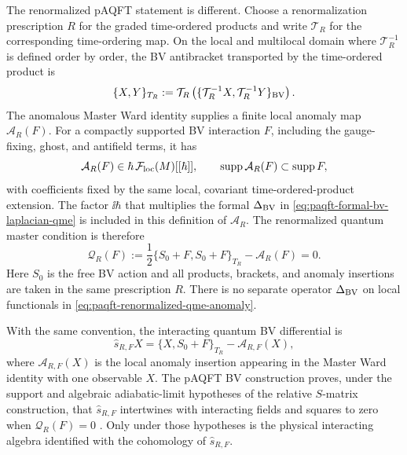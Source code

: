 The renormalized pAQFT statement is different.  Choose a renormalization
prescription \(R\) for the graded time-ordered products and write
\(\mathcal T_R\) for the corresponding time-ordering map.  On the local and
multilocal domain where \(\mathcal T_R^{-1}\) is defined order by order, the
BV antibracket transported by the time-ordered product is
\begin{equation}
  \{X,Y\}_{T_R}
  :=
  \mathcal T_R
  \left(
    \{\mathcal T_R^{-1}X,\mathcal T_R^{-1}Y\}_{\rm BV}
  \right).
  \label{eq:paqft-transported-bv-antibracket}
\end{equation}
The anomalous Master Ward identity supplies a finite local anomaly map
\(\mathcal A_R(F)\).  For a compactly supported BV interaction \(F\), including
the gauge-fixing, ghost, and antifield terms, it has
\[
  \mathcal A_R(F)\in\hbar\,\mathcal F_{\rm loc}(M)[[\hbar]],
  \qquad
  \operatorname{supp}\mathcal A_R(F)\subset\operatorname{supp}F,
\]
with coefficients fixed by the same local, covariant time-ordered-product
extension.  The factor \(\ii\hbar\) that multiplies the formal
\(\Delta_{\rm BV}\) in
\eqref{eq:paqft-formal-bv-laplacian-qme} is included in this definition of
\(\mathcal A_R\).  The renormalized quantum master condition is therefore
\begin{equation}
  \mathcal Q_R(F)
  :=
  \frac12
  \{S_0+F,S_0+F\}_{T_R}
  -
  \mathcal A_R(F)
  =
  0 .
  \label{eq:paqft-renormalized-qme-anomaly}
\end{equation}
Here \(S_0\) is the free BV action and all products, brackets, and anomaly
insertions are taken in the same prescription \(R\).  There is no separate
operator \(\Delta_{\rm BV}\) on local functionals in
\eqref{eq:paqft-renormalized-qme-anomaly}.

With the same convention, the interacting quantum BV differential is
\begin{equation}
  \widehat s_{R,F}X
  =
  \{X,S_0+F\}_{T_R}
  -
  \mathcal A_{R,F}(X),
  \label{eq:paqft-renormalized-quantum-bv-differential}
\end{equation}
where \(\mathcal A_{R,F}(X)\) is the local anomaly insertion appearing in the
Master Ward identity with one observable \(X\).  The pAQFT BV construction
proves, under the support and algebraic adiabatic-limit hypotheses of the
relative \(S\)-matrix construction, that
\(\widehat s_{R,F}\) intertwines with interacting fields and squares to zero
when \(\mathcal Q_R(F)=0\)
\cite{FredenhagenRejzner2013BVPerturbativeAQFT,Rejzner2011BVLocallyCovariant}.
Only under those hypotheses is the physical interacting algebra identified with
the cohomology of \(\widehat s_{R,F}\).

